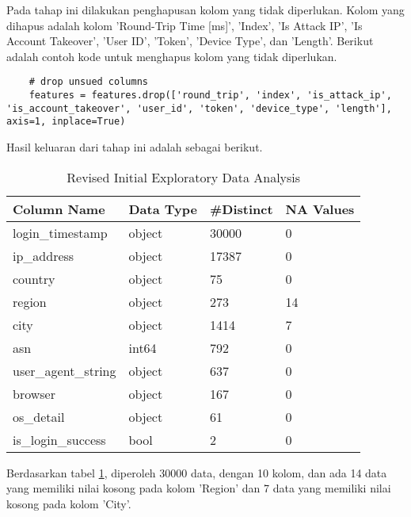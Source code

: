 Pada tahap ini dilakukan penghapusan kolom yang tidak diperlukan. Kolom yang dihapus adalah kolom 'Round-Trip Time [ms]', 'Index', 'Is Attack IP', 'Is Account Takeover', 'User ID', 'Token', 'Device Type', dan 'Length'. Berikut adalah contoh kode untuk menghapus kolom yang tidak diperlukan.

\begin{lstlisting}
    # drop unsued columns
    features = features.drop(['round_trip', 'index', 'is_attack_ip', 'is_account_takeover', 'user_id', 'token', 'device_type', 'length'], axis=1, inplace=True)
    \end{lstlisting}

Hasil keluaran dari tahap ini adalah sebagai berikut. 

\begin{table}[H]
	\caption{Revised Initial Exploratory Data Analysis}
    \centering
    \begin{tabular}{|l|l|l|l|}
    \hline
    \textbf{Column Name} & \textbf{Data Type} & \textbf{\#Distinct} & \textbf{NA Values} \\ \hline
    login\_timestamp & object & 30000 & 0 \\ 
    ip\_address & object & 17387 & 0 \\ 
    country & object & 75 & 0 \\ 
    region & object & 273 & 14 \\ 
    city & object & 1414 & 7 \\ 
    asn & int64 & 792 & 0 \\ 
    user\_agent\_string & object & 637 & 0 \\ 
    browser & object & 167 & 0 \\ 
    os\_detail & object & 61 & 0 \\ 
    is\_login\_success & bool & 2 & 0 \\ \hline
    \end{tabular}
    \label{tab:revised_initial_eda}
    \end{table}

    Berdasarkan tabel \ref{tab:revised_initial_eda}, diperoleh 30000 data, dengan 10 kolom, dan ada 14 data yang memiliki nilai kosong pada kolom 'Region' dan 7 data yang memiliki nilai kosong pada kolom 'City'.
